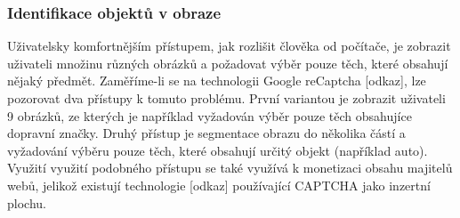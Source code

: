 \documentclass[
  field=ainfp,
  master=true,
  biblatex,
  sourcecodes=false,
  theorems=false,
  glossaries,
  index
]{kidiplom}
\begin{document}
\subsubsection*{Identifikace objektů v obraze}
Uživatelsky komfortnějším přístupem, jak rozlišit člověka od počítače, je zobrazit uživateli množinu různých obrázků a požadovat výběr pouze těch, které obsahují nějaký předmět. Zaměříme-li se na technologii Google reCaptcha [odkaz], lze pozorovat dva přístupy k tomuto problému. První variantou je zobrazit uživateli 9 obrázků, ze kterých je například vyžadován výběr pouze těch obsahujíce dopravní značky. Druhý přístup je segmentace obrazu do několika částí a vyžadování výběru pouze těch, které obsahují určitý objekt (například auto). Využití využití podobného přístupu se také využívá k monetizaci obsahu majitelů webů, jelikož existují technologie [odkaz] používající CAPTCHA jako inzertní plochu. 
\end{document}
